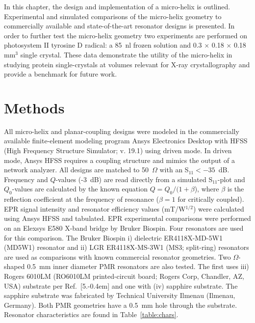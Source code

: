 In this chapter, the design and implementation of a micro-helix is outlined. Experimental and simulated comparisons of the micro-helix geometry to commercially available and state-of-the-art resonator designs is presented. In order to further test the micro-helix geometry two experiments are performed on photosystem II tyrosine D radical: a 85~nl frozen solution and 0.3 $\times$ 0.18 $\times$ 0.18 mm$^3$ single crystal. These data demonstrate the utility of the micro-helix in studying protein single-crystals at volumes relevant for X-ray crystallography and provide a benchmark for future work.


\section{Methods}
All micro-helix and planar-coupling designs were modeled in the commercially available finite-element modeling program Ansys Electronics Desktop with HFSS (High Frequency Structure Simulator; v. 19.1) using driven mode. In driven mode, Ansys HFSS requires a coupling structure and mimics the output of a network analyzer. All designs are matched to 50~$\Omega$ with an S$_{11} < -35$~dB. Frequency and $Q$-values (-3~dB) are read directly from a simulated S$_{11}$-plot and $Q_0$-values are calculated by the known equation $Q=Q_0/(1+\beta$), where $\beta$ is the reflection coefficient at the frequency of resonance ($\beta=1$ for critically coupled). EPR signal intensity and resonator efficiency values (mT/W$^{1/2}$) were calculated using Ansys HFSS \cite{misrabook} and tabulated. EPR experimental comparisons were performed on an Elexsys E580 X-band bridge by Bruker Biospin. Four resonators are used for this comparison. The Bruker Biospin i) dielectric ER4118X-MD-5W1 (MD5W1) resonator and ii) LGR ER4118X-MS-3W1 (MS3; split-ring) resonators are used as comparisons with known commercial resonator geometries. Two $\Omega$-shaped 0.5~mm inner diameter PMR resonators are also tested. The first uses iii) Rogers 6010LM (RO6010LM printed-circuit board; Rogers Corp, Chandler, AZ, USA) substrate per Ref.~[5.\kern-0.4em] and one with (iv) sapphire substrate. The sapphire substrate was fabricated by Technical University Ilmenau (Ilmenau, Germany). Both PMR geometries have a 0.5~mm hole through the substrate. Resonator characteristics are found in Table~\ref{table:chars}. 

